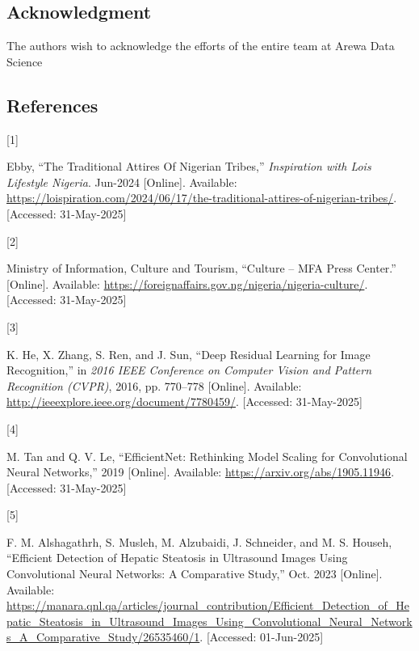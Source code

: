 \documentclass[
  journal,
]{IEEEtran}%
\newlength{\cslhangindent}
\newlength{\csllabelwidth}
\newenvironment{CSLReferences}[2] %
 {\begin{list}{}{%
  \setlength{\itemindent}{0pt}
  \setlength{\leftmargin}{0pt}
  \setlength{\parsep}{0pt}
  \ifodd #1
   \setlength{\leftmargin}{\cslhangindent}
   \setlength{\itemindent}{-1\cslhangindent}
  \fi
  \setlength{\itemsep}{#2\baselineskip}}}
 {\end{list}}
\newcommand{\CSLLeftMargin}[1]{\parbox[t]{\csllabelwidth}{\strut#1\strut}}
\newcommand{\CSLRightInline}[1]{\parbox[t]{\linewidth - \csllabelwidth}{\strut#1\strut}}
\begin{document}
\subsection*{Acknowledgment}\label{acknowledgment}

The authors wish to acknowledge the efforts of the entire team at Arewa
Data Science

\subsection*{References}\label{references}

\label{refs}
\begin{CSLReferences}{0}{0}
\CSLLeftMargin{{[}1{]} }%
\CSLRightInline{Ebby, {``The {Traditional} {Attires} {Of} {Nigerian}
{Tribes},''} \emph{Inspiration with Lois{\textbar} Lifestyle {\textbar}
Nigeria}. Jun-2024 {[}Online{]}. Available:
\url{https://loispiration.com/2024/06/17/the-traditional-attires-of-nigerian-tribes/}.
{[}Accessed: 31-May-2025{]}}

\CSLLeftMargin{{[}2{]} }%
\CSLRightInline{Ministry of Information, Culture and Tourism, {``Culture
-- {MFA} {Press} {Center}.''} {[}Online{]}. Available:
\url{https://foreignaffairs.gov.ng/nigeria/nigeria-culture/}.
{[}Accessed: 31-May-2025{]}}

\CSLLeftMargin{{[}3{]} }%
\CSLRightInline{K. He, X. Zhang, S. Ren, and J. Sun, {``Deep {Residual}
{Learning} for {Image} {Recognition},''} in \emph{2016 {IEEE}
{Conference} on {Computer} {Vision} and {Pattern} {Recognition}
({CVPR})}, 2016, pp. 770--778 {[}Online{]}. Available:
\url{http://ieeexplore.ieee.org/document/7780459/}. {[}Accessed:
31-May-2025{]}}

\CSLLeftMargin{{[}4{]} }%
\CSLRightInline{M. Tan and Q. V. Le, {``{EfficientNet}: {Rethinking}
{Model} {Scaling} for {Convolutional} {Neural} {Networks},''} 2019
{[}Online{]}. Available: \url{https://arxiv.org/abs/1905.11946}.
{[}Accessed: 31-May-2025{]}}

\CSLLeftMargin{{[}5{]} }%
\CSLRightInline{F. M. Alshagathrh, S. Musleh, M. Alzubaidi, J.
Schneider, and M. S. Househ, {``Efficient {Detection} of {Hepatic}
{Steatosis} in {Ultrasound} {Images} {Using} {Convolutional} {Neural}
{Networks}: {A} {Comparative} {Study},''} Oct. 2023 {[}Online{]}.
Available:
\url{https://manara.qnl.qa/articles/journal_contribution/Efficient_Detection_of_Hepatic_Steatosis_in_Ultrasound_Images_Using_Convolutional_Neural_Networks_A_Comparative_Study/26535460/1}.
{[}Accessed: 01-Jun-2025{]}}


\end{CSLReferences}
\end{document}
